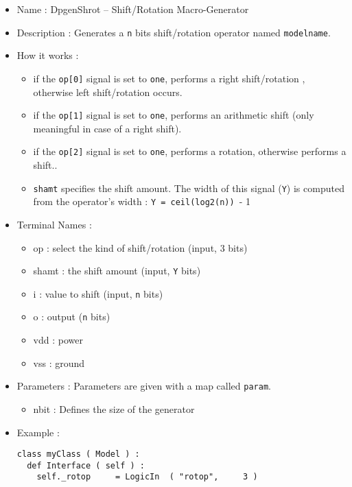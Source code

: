 \begin{itemize}
    \item Name : DpgenShrot -- Shift/Rotation Macro-Generator
    \item Description : Generates a \verb-n- bits shift/rotation operator named \verb-modelname-.
    \item How it works :
    \begin{itemize}
        \item if the \verb-op[0]- signal is set to \verb-one-, performs a right shift/rotation , otherwise left shift/rotation occurs.
        \item if the \verb-op[1]- signal is set to \verb-one-, performs an arithmetic shift (only meaningful in case of a right shift).
        \item if the \verb-op[2]- signal is set to \verb-one-, performs a rotation, otherwise performs a shift..
        \item \verb-shamt- specifies the shift amount. The width of this signal (\verb-Y-) is computed from the operator's width : \verb-Y = ceil(log2(n)) -- 1
    \end{itemize}
    \item Terminal Names :
    \begin{itemize}
        \item op : select the kind of shift/rotation (input, 3 bits)
        \item shamt : the shift amount (input, \verb-Y- bits)
        \item i : value to shift (input, \verb-n- bits)
        \item o : output (\verb-n- bits)
        \item vdd : power
        \item vss : ground
    \end{itemize}
    \item Parameters : Parameters are given with a map called \verb-param-.
    \begin{itemize}
        \item nbit : Defines the size of the generator
    \end{itemize}
    \item Example :
\begin{verbatim}
class myClass ( Model ) :
  def Interface ( self ) :
    self._rotop     = LogicIn  ( "rotop",     3 )
    

\end{verbatim}
\end{itemize}
